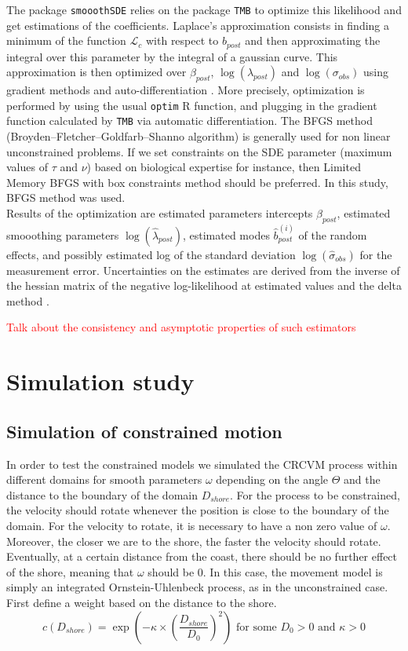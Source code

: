\documentclass[11pt]{article}
\newcommand {\1}{\mathbb{1}}
\begin{document}
The package \texttt{smooothSDE} relies on the package \texttt{TMB} to optimize this likelihood and get estimations of the coefficients.
Laplace's approximation consists in finding a minimum of the function $\mathcal{L}_c$ with respect to $b_{post}$ and then approximating the integral over this parameter by the integral of a gaussian curve.
This approximation is then optimized over $\beta_{post}$, $\log(\lambda_{post})$ and $\log(\sigma_{obs})$ using gradient methods and auto-differentiation \cite{kristensen_tmb_2016}. More precisely, optimization is  performed by using the usual \texttt{optim} R function, and plugging in the gradient function calculated by \texttt{TMB} via automatic differentiation. The BFGS method (Broyden–Fletcher–Goldfarb–Shanno algorithm) is generally used for non linear unconstrained problems. If we set constraints on the SDE parameter (maximum values of $\tau$ and $\nu$) based on biological expertise for instance, then Limited Memory BFGS with box constraints method should be preferred. In this study, BFGS method was used.\\
Results of the optimization are estimated parameters intercepts $\hat{\beta}_{post}$, estimated smooothing parameters $\log(\hat{\lambda}_{post})$, estimated modes $\hat{b}_{post}^{(i)}$ of the random effects, and possibly estimated log of the standard deviation $\log(\hat{\sigma}_{obs})$ for the measurement error.
Uncertainties on the estimates are derived from the inverse of the hessian matrix of the negative log-likelihood at estimated values and the delta method \cite{kristensen_tmb_2016}.

\textcolor{red}{Talk about the consistency and asymptotic properties of such estimators}


\section{Simulation study}
\label{section: simulation study}





\subsection{Simulation of constrained motion}
In order to test the constrained models we simulated the CRCVM process within different domains for smooth parameters $\omega$ depending on the angle $\Theta$ and the distance to the boundary of the domain $D_{shore}$.
For the process to be constrained, the velocity should rotate whenever the position is close to the boundary of the domain. For the velocity to rotate, it is necessary to have a non zero value of $\omega$. Moreover, the closer we are to the shore, the faster the velocity should rotate. 
Eventually, at a certain distance from the coast, there should be no further effect of the shore, meaning that $\omega$ should be $0$. In this case, the movement model is simply an integrated Ornstein-Uhlenbeck process, as in the unconstrained case.
First define a weight based on the distance to the shore.
\[c(D_{shore})=\exp\left(-\kappa \times \left(\frac{D_{shore}}{D_0}\right)^2\right)\mbox{ for some } D_0>0 \mbox{ and } \kappa>0\]
\end{document}
